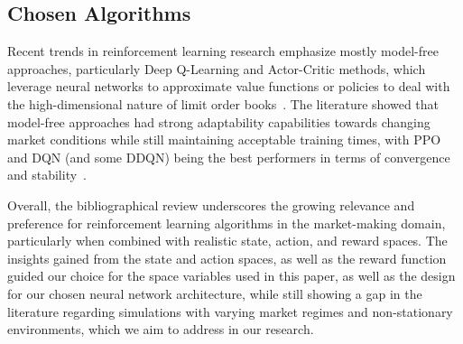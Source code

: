 \subsection{Chosen Algorithms}
\label{subsec:chosen-algorithms}
Recent trends in reinforcement learning research emphasize mostly model-free approaches, particularly Deep Q-Learning and Actor-Critic methods,
which leverage neural networks to approximate value functions or policies to deal with the high-dimensional nature of limit order books~\cite{Patel2018, Ganesh2019}.
The literature showed that model-free approaches had strong adaptability capabilities towards changing market conditions
while still maintaining acceptable training times, with PPO and DQN (and some DDQN) being the best performers in terms of convergence and stability~\cite{Sun2022, Gasperov2021a}.

\begin{figure}[H]
    \centering
\end{figure}

Overall, the bibliographical review underscores the growing relevance and preference for reinforcement learning algorithms in the market-making domain,
particularly when combined with realistic state, action, and reward spaces.
The insights gained from the state and action spaces, as well as the reward function guided our choice for the space variables used in this paper,
as well as the design for our chosen neural network architecture,
while still showing a gap in the literature regarding simulations with varying market regimes
and non-stationary environments, which we aim to address in our research.
